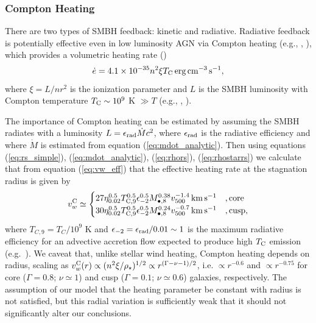 \documentclass[usenatbib,fleqn]{mn2e}
\newcommand{\densSlope}{\nu}
\begin{document}
\subsubsection{Compton Heating}

There are two types of SMBH feedback: kinetic and radiative.  Radiative feedback is potentially effective even in low luminosity AGN via Compton heating (e.g., \citealt{Sazonov+04}, \citealt{Ciotti+10}), which provides a volumetric heating rate (\citealt{Gan+14})
\begin{align}
\dot{e} = 4.1\times 10^{-35}n^{2}\xi T_{\rm C}\,{\rm erg\,cm^{-3}\,s^{-1}},
\end{align}
where $\xi = L/n r^{2}$ is the ionization parameter and $L$ is the SMBH luminosity with Compton temperature $T_{\rm C} \sim 10^{9}$ K $\gg T$ (e.g., \citealt{Ho99}, \citealt{Eracleous+10}).  

The importance of Compton heating can be estimated by assuming the SMBH
radiates with a luminosity $L = \epsilon_{\rm rad} \dot{M}c^{2}$, where
$\epsilon_{\rm rad}$ is the radiative efficiency and where $\dot{M}$ is
estimated from equation (\ref{eq:mdot_analytic}).  Then using
equations (\ref{eq:rs_simple}), (\ref{eq:mdot_analytic}),
(\ref{eq:rhors}), (\ref{eq:rhostarrs}) we calculate that from equation
(\ref{eq:vw_eff}) that the effective heating rate at the stagnation radius is given by
\begin{align} v_{w}^{\rm C} \simeq
  \begin{cases} 27 \eta_{0.02}^{0.5}T_{\rm
C,9}^{0.5}\epsilon_{-2}^{0.5} M_{\bullet,8}^{0.38}v_{500}^{-1.4}\,{\rm
km\,s^{-1}} &, \text{core}\\ 30 \eta_{0.02}^{0.5}T_{\rm
C,9}^{0.5}\epsilon_{-2}^{0.5} M_{\bullet,8}^{0.24}v_{500}^{-0.7}\,{\rm
km\,s^{-1}} &, \text{cusp},
  \end{cases}
  \label{eq:vC}
\end{align} where $T_{C,9} = T_{C}/10^{9}$ K and $\epsilon_{-2} =
\epsilon_{\rm rad}/0.01 \sim 1$ is the maximum radiative efficiency
for an advective accretion flow expected to produce high $T_{\rm C}$
emission (e.g.~\citealt{Narayan&Yi95}).  We caveat that, unlike
stellar wind heating, Compton heating depends on radius, scaling as
$v_{w}^{\rm C}(r) \propto (n^{2}\xi/\rho_{\star})^{1/2} \propto
r^{(\Gamma-\densSlope-1)/2}$, i.e. $\propto r^{-0.6}$ and $\propto r^{-0.75}$
for core ($\Gamma = 0.8$; $\densSlope \simeq 1$) and cusp ($\Gamma = 0.1$;
$\densSlope \simeq 0.6$) galaxies, respectively.  The assumption of our model that the heating
parameter be constant with radius is not satisfied, but this radial
variation is sufficiently weak that it should not significantly alter
our conclusions.
\end{document}
